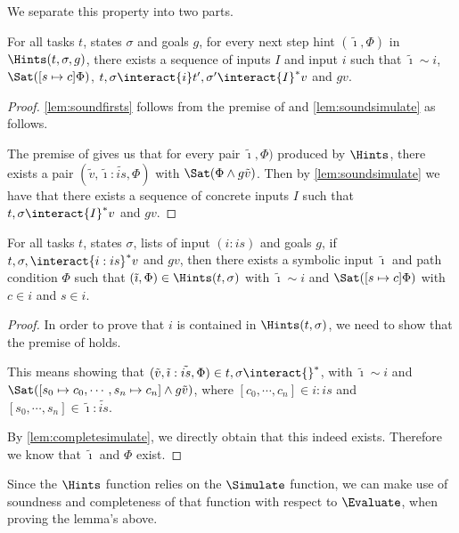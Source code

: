 We separate this property into two parts.


\begin{lemma}
  \label{lem:soundfirsts}

For all tasks $t$, states $\sigma$ and goals $g$,
for every next step hint $(\tilde{\imath},\Phi)$ in $\Hints(t,\sigma,g)$,
there exists a sequence of inputs $I$ and input $i$ such that $\tilde{\imath}\sim i$,
$\Sat([s\mapsto c]\Phi)$, $t,\sigma\interact{i} t',\sigma'\interact{I}^* v$ and $gv$.
\end{lemma}

\begin{proof}
  \cref{lem:soundfirsts} follows from the premise of  and \cref{lem:soundsimulate} as follows.

  The premise of  gives us that for every pair $\tilde{\imath},\Phi)$ produced by $\Hints$,
  there exists a pair $(\tilde{v},\tilde{\imath}:\tilde{is},\Phi)$ with $\Sat(\Phi\land g \tilde{v})$.
  Then by \cref{lem:soundsimulate} we have that there exists a sequence of concrete inputs $I$ such that
  $t,\sigma\interact{I}^*v$ and $g v$.
\end{proof}

\begin{lemma}
  \label{lem:completefirsts}
  For all tasks $t$, states $\sigma$, lists of input $(i:is)$ and goals $g$,
  if $t,\sigma,\interact{i:is}^*v$ and $g v$, then there exists a symbolic input $\tilde{\imath}$ and path condition $\Phi$
  such that $(\tilde{\imath},\Phi)\in\Hints(t,\sigma)$ with $\tilde{\imath}\sim i$ and $\Sat([s\mapsto c]\Phi)$ with $c\in i$ and $s\in i$.
\end{lemma}

\begin{proof}
  In order to prove that $i$ is contained in $\Hints(t,\sigma)$, we need to show that the premise of  holds.

  This means showing that $(\tilde{v},\tilde{\imath}:\tilde{is},\Phi)\in t,\sigma\interact{}^*$, with $\tilde{\imath}\sim i$ and $\Sat([s_0\mapsto c_0,\cdots,s_n\mapsto c_n]\land g\tilde{v})$, where $[c_0,\cdots,c_n]\in i:is$ and $[s_0,\cdots,s_n]\in \tilde{\imath}:\tilde{is}$.

  By \cref{lem:completesimulate}, we directly obtain that this indeed exists. Therefore we know that $\tilde{\imath}$ and $\Phi$ exist.
\end{proof}


Since the $\Hints$ function relies on the $\Simulate$ function, we can make use of soundness and completeness of that function with respect to $\Evaluate$, when proving the lemma's above.

